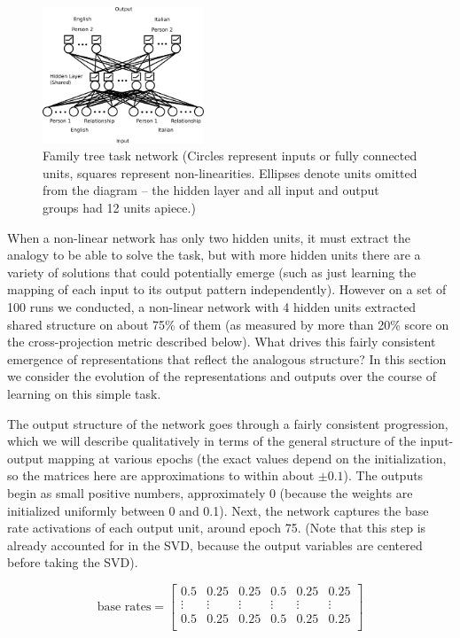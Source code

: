 \documentclass[10pt,letterpaper]{article}
\begin{document}
\begin{figure}
\centering
\includegraphics[width=0.43\textwidth]{figures/family_tree_network_diagram.png}
\caption{Family tree task network (Circles represent inputs or fully connected units, squares represent non-linearities. Ellipses denote units omitted from the diagram -- the hidden layer and all input and output groups had 12 units apiece.)}
\label{family_tree_network_diagram}
\end{figure}
When a non-linear network has only two hidden units, it must extract the analogy to be able to solve the task, but with more hidden units there are a variety of solutions that could potentially emerge (such as just learning the mapping of each input to its output pattern independently). However on a set of 100 runs we conducted, a non-linear network with 4 hidden units extracted shared structure on about 75\% of them (as measured by more than 20\% score on the cross-projection metric described below). What drives this fairly consistent emergence of representations that reflect the analogous structure? In this section we consider the evolution of the representations and outputs over the course of learning on this simple task. \par 
The output structure of the network goes through a fairly consistent progression, which we will describe qualitatively in terms of the general structure of the input-output mapping at various epochs (the exact values depend on the initialization, so the matrices here are approximations to within about \(\pm 0.1\)). The outputs begin as small positive numbers, approximately 0 (because the weights are initialized uniformly between 0 and 0.1). Next, the network captures the base rate activations of each output unit, around epoch 75. (Note that this step is already accounted for in the SVD, because the output variables are centered before taking the SVD). \par
{ 
\[ 
\text{base rates} = \left[ \begin{matrix} 
0.5 & 0.25 & 0.25 & 0.5 & 0.25 & 0.25 \\
\vdots & \vdots &\vdots &\vdots &\vdots &\vdots \\
 0.5 & 0.25 & 0.25 & 0.5 & 0.25 & 0.25\\
\end{matrix}  \right] 
\] 
}
\end{document}
